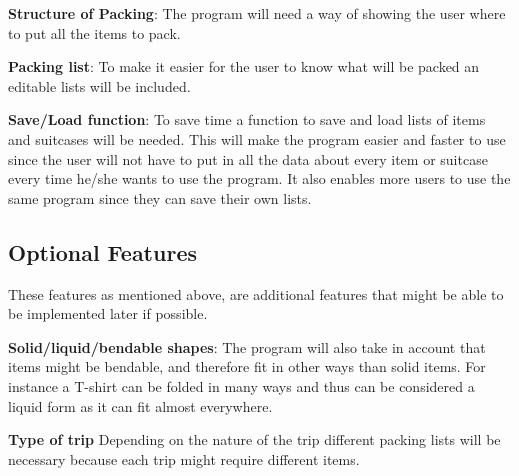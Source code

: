 \textbf{Structure of Packing}:
The program will need a way of showing the user where to put all the items to pack.
\newline

\textbf{Packing list}:
To make it easier for the user to know what will be packed an editable lists will be included.
\newline

\textbf{Save/Load function}:
To save time a function to save and load lists of items and suitcases will be needed. This will make the program easier and faster to use since the user will not have to put in all the data about every item or suitcase every time he/she wants to use the program. It also enables more users to use the same program since they can save their own lists.
\newline

\subsection{Optional Features}
These features as mentioned above, are additional features that might be able to be implemented later if possible.\newline

\textbf{Solid/liquid/bendable shapes}:
The program will also take in account that items might be bendable, and therefore fit in other ways than solid items. For instance a T-shirt can be folded in many ways and thus can be considered a liquid form as it can fit almost everywhere.
\newline

\textbf{Type of trip}
Depending on the nature of the trip different packing lists will be necessary because each trip might require different items.
\newline
